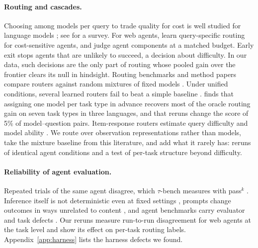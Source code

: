 \paragraph{Routing and cascades.} Choosing among models per query to trade quality for cost is well studied for language models \citep{chen2023frugalgpt,ong2025routellm,ding2024hybridllm,gupta2024cascades,peale2026flexibleRouting}; see \citet{moslem2026routingsurvey} for a survey. For web agents, \citet{webrouter2025} learn query-specific routing for cost-sensitive agents, and \citet{hajimiri2026budgetmatched} judge agent components at a matched budget. Early exit \citep{lu2025earlyexit} stops agents that are unlikely to succeed, a decision about difficulty. In our data, such decisions are the only part of routing whose pooled gain over the frontier clears its null in hindsight. Routing benchmarks and method papers compare routers against random mixtures of fixed models \citep{hu2024routerbench,jitkrittum2025uniroute}. Under unified conditions, several learned routers fail to beat a simple baseline \citep{li2026llmrouterbench}. \citet{lee2026routinggap} finds that assigning one model per task type in advance recovers most of the oracle routing gain on seven task types in three languages, and that reruns change the score of 5\% of model--question pairs. Item-response routers estimate query difficulty and model ability \citep{song2025irtrouter}. We route over observation representations rather than models, take the mixture baseline from this literature, and add what it rarely has: reruns of identical agent conditions and a test of per-task structure beyond difficulty.

\paragraph{Reliability of agent evaluation.} Repeated trials of the same agent disagree, which $\tau$-bench measures with pass$^k$ \citep{yao2025taubench}. Inference itself is not deterministic even at fixed settings \citep{he2025nondeterminism,yuan2025numerical}, prompts change outcomes in ways unrelated to content \citep{sclar2024promptformat}, and agent benchmarks carry evaluator and task defects \citep{elhattami2025webarenaverified,bhat2026benchmarkingbenchmarks}. Our reruns measure run-to-run disagreement for web agents at the task level and show its effect on per-task routing labels. Appendix~\ref{app:harness} lists the harness defects we found.
